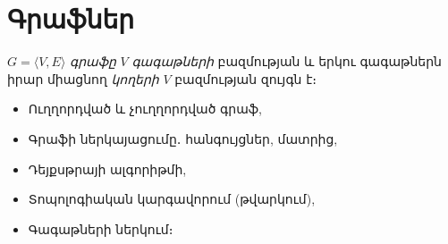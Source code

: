 

%
%
\chapter{Գրաֆներ}

\(G=\langle V, E\rangle\) \emph{գրաֆը} \(V\) \emph{գագաթների} բազմության և երկու գագաթներն իրար միացնող \emph{կողերի} \(V\) բազմության զույգն է։

\begin{itemize}
  \item Ուղղորդված և չուղղորդված գրաֆ,
  \item Գրաֆի ներկայացումը․ հանգույցներ, մատրից,
  \item Դեյքսթրայի ալգորիթմի,
  \item Տոպոլոգիական կարգավորում (թվարկում),
  \item Գագաթների ներկում։
\end{itemize}
